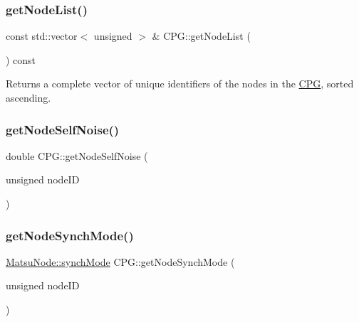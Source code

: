 \subsubsection{\texorpdfstring{get\+Node\+List()}{getNodeList()}}
{\footnotesize\ttfamily const std\+::vector$<$ unsigned $>$ \& C\+P\+G\+::get\+Node\+List (\begin{DoxyParamCaption}{ }\end{DoxyParamCaption}) const}



Returns a complete vector of unique identifiers of the nodes in the \mbox{\hyperlink{classCPG}{C\+PG}}, sorted ascending. 

\mbox{\label{classCPG_ad3ddf0fa097221f855e5f52fc6ec01bc}} 
\subsubsection{\texorpdfstring{get\+Node\+Self\+Noise()}{getNodeSelfNoise()}}
{\footnotesize\ttfamily double C\+P\+G\+::get\+Node\+Self\+Noise (\begin{DoxyParamCaption}\item[{unsigned}]{node\+ID }\end{DoxyParamCaption})}

\mbox{\label{classCPG_a90390492d725a180160ee2743619fd27}} 
\subsubsection{\texorpdfstring{get\+Node\+Synch\+Mode()}{getNodeSynchMode()}}
{\footnotesize\ttfamily \mbox{\hyperlink{classMatsuNode_a725e228db39b8842f851ddf88f640bed}{Matsu\+Node\+::synch\+Mode}} C\+P\+G\+::get\+Node\+Synch\+Mode (\begin{DoxyParamCaption}\item[{unsigned}]{node\+ID }\end{DoxyParamCaption})}

\mbox{\label{classCPG_a61c0a3f2278d4a1db88d1d5a7dd0771f}} 
